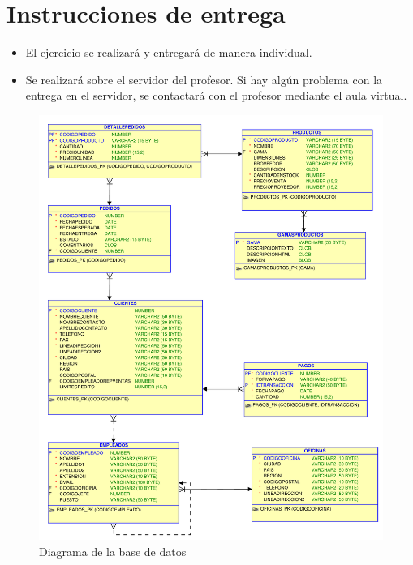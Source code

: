 \section{Instrucciones de entrega}
\begin{itemize}
\item El ejercicio se realizará y entregará de manera individual.
\item Se realizará sobre el servidor del profesor. Si hay algún problema con la entrega en el servidor, se contactará con el profesor mediante el aula virtual.
\end{itemize}



\begin{figure}[h]
  \begin{center}
    \includegraphics[width=.9\textwidth]{./jardineria.pdf}
  \end{center}
  \caption{Diagrama de la base de datos}\label{fig:esquema}
\end{figure}






